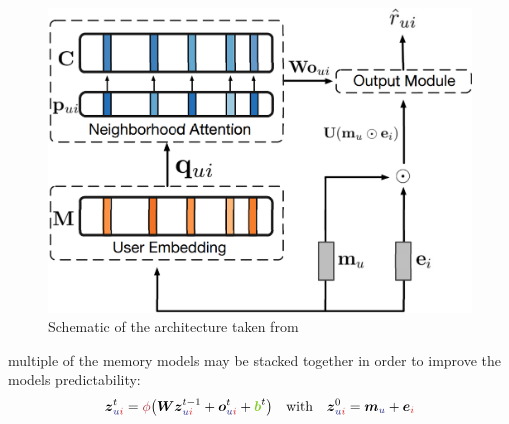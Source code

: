 \begin{figure}[h]
  \centering
  \includegraphics[width=0.7\linewidth]{figures/CMN.png}
  \caption{Schematic of the architecture taken from \cite{he2017neural}}
  \label{fig:}
\end{figure}
multiple of the memory models may be stacked together in order to improve the models predictability:
\begin{align}
  \vec{z}_{\idxu\idxi}^{t}=\phic\big(\vec{W}\vec{z}_{\idxu\idxi}^{t-1}+\vec{o}_{\idxu\idxi}^{t}
  +\vec{\mcb}^{t}\big)&&\text{with}&&\vec{z}_{\idxu\idxi}^{0}=\vec{m}_{\idxu}+\vec{e}_{\idxi}
\end{align}

